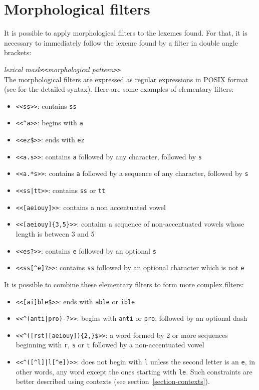 \section{Morphological filters}
\label{section-filters}

It is possible to apply morphological filters to the lexemes found. For that, it is necessary to
immediately follow the lexeme found by a filter in double angle brackets:

\bigskip
\noindent
\textit{lexical mask}\verb$<<$\textit{morphological pattern}\verb$>>$ \\


\bigskip{}
\noindent The morphological filters are expressed as regular expressions in POSIX
format (see \cite{TRE} for the detailed syntax). Here are some examples of
elementary filters:



\begin{itemize}
  \item \verb$<<ss>>$: contains \verb$ss$
  \item \verb$<<^a>>$: begins with \verb$a$
  \item \verb+<<ez$>>+: ends with \verb$ez$
  \item \verb$<<a.s>>$: contains \verb$a$ followed by any character, followed by \verb$s$
  \item \verb$<<a.*s>>$: contains \verb$a$ followed by a sequence of any character, followed by \verb$s$
  \item \verb$<<ss|tt>>$: contains \verb$ss$ or \verb$tt$
  \item \verb$<<[aeiouy]>>$: contains a non accentuated vowel
  \item \verb$<<[aeiouy]{3,5}>>$: contains a sequence of non-accentuated vowels whose length 
        is between 3 and 5
  \item \verb$<<es?>>$: contains \verb$e$ followed by an
  optional \verb$s$
  \item \verb$<<ss[^e]?>>$: contains \verb$ss$ followed by an optional character which is not \verb$e$
\end{itemize}

\bigskip
\noindent It is possible to combine these elementary filters to form more complex filters:

\begin{itemize}
  \item \verb+<<[ai]ble$>>+: ends with \verb$able$ or \verb$ible$
  \item \verb$<<^(anti|pro)-?>>$: begins with \verb$anti$ or \verb$pro$, followed by an optional dash
  \item \verb+<<^([rst][aeiouy]){2,}$>>+: a word formed by 2 or more sequences beginning 
        with \verb$r$, \verb$s$
  or \verb$t$ followed by a non-accentuated vowel
  \item \verb!<<^([^l]|l[^e])>>!: does not begin with \verb$l$ unless the second letter is an
  \verb$e$, in other words, any word except the ones starting with \verb$le$. Such constraints
  are better described using contexts (see section~\ref{section-contexts}).
\end{itemize}

